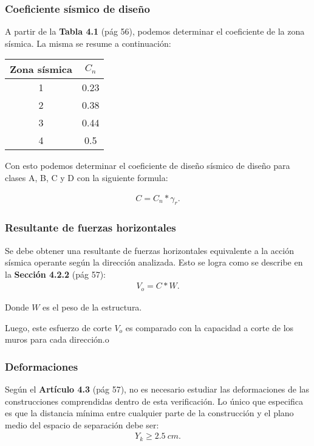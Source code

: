 \documentclass[../main.tex]{subfiles}
\begin{document}
\subsubsection{Coeficiente sísmico de diseño}

A partir de la \textbf{Tabla 4.1} (pág 56), podemos determinar el coeficiente
de la zona sísmica. La misma se resume a continuación:

\begin{center}
  \begin{tabular}{|c|c|}
    \hline
    \textbf{Zona sísmica} & $C_n$ \\
    \hline
    1 & 0.23 \\
    \hline
    2 & 0.38 \\
    \hline
    3 & 0.44 \\
    \hline
    4 & 0.5 \\
    \hline
  \end{tabular} 
\end{center}

Con esto podemos determinar el coeficiente de diseño sísmico de diseño para
clases A, B, C y D con la siguiente formula:

\begin{align*}
  C = C_n * \gamma_r
.\end{align*}

\subsubsection{Resultante de fuerzas horizontales}

Se debe obtener una resultante de fuerzas horizontales equivalente a la acción
sísmica operante según la dirección analizada. Esto se logra como se describe 
en la \textbf{Sección 4.2.2} (pág 57):
\begin{align*}
  V_o = C * W
.\end{align*}

Donde $W$ es el peso de la estructura.

Luego, este esfuerzo de corte $V_o$ es comparado con la capacidad a corte de los
muros para cada dirección.o

\subsubsection{Deformaciones}

Según el \textbf{Artículo 4.3} (pág 57), no es necesario estudiar las
deformaciones de las construcciones comprendidas dentro de esta verificación.
Lo único que especifica es que la distancia mínima entre cualquier parte de
la construcción y el plano medio del espacio de separación debe ser:
\begin{align*}
  Y_k \geq \SI{2.5}{cm}
.\end{align*}
\end{document}
